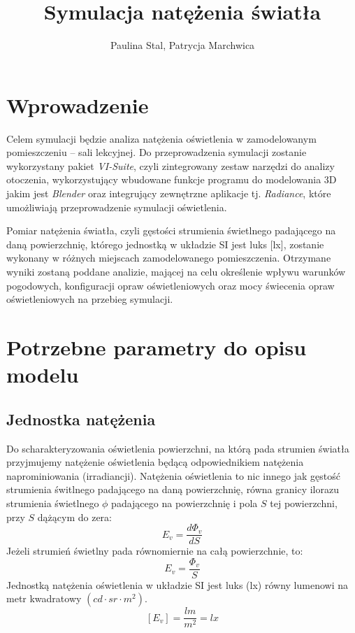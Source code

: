 \documentclass[a4paper,12pt]{article}
\title{Symulacja natężenia światła}
\author{Paulina Stal, Patrycja Marchwica}
\date{}
\begin{document}
	\maketitle
	
	\section{Wprowadzenie}
	\label{sec:wprowadzenie}
	
	Celem symulacji będzie analiza natężenia oświetlenia w zamodelowanym pomieszczeniu -- sali lekcyjnej. Do przeprowadzenia symulacji zostanie wykorzystany pakiet \emph{VI-Suite}, czyli zintegrowany zestaw narzędzi do analizy otoczenia, wykorzystujący wbudowane funkcje programu do modelowania 3D jakim jest \emph{Blender} oraz integrujący zewnętrzne aplikacje tj. \emph{Radiance}, które umożliwiają przeprowadzenie symulacji oświetlenia.
	
	Pomiar natężenia światła, czyli gęstości strumienia świetlnego padającego na daną powierzchnię, którego jednostką w układzie SI jest luks [lx], zostanie wykonany w różnych miejscach zamodelowanego pomieszczenia. Otrzymane wyniki zostaną poddane analizie, mającej na celu określenie wpływu warunków pogodowych, konfiguracji opraw oświetleniowych oraz mocy świecenia opraw oświetleniowych na przebieg symulacji.  
	

	\section{Potrzebne parametry do opisu modelu}
	 \label{sec:opis_modelu}

	\subsection{Jednostka natężenia}
	\label{subsec:jednostka_natezenia}

	Do scharakteryzowania oświetlenia powierzchni, na którą pada strumien światła przyjmujemy natężenie oświetlenia będącą odpowiednikiem natężenia naprominiowania (irradiancji). Natężenia oświetlenia to nic innego jak gęstość strumienia świtlnego padającego na daną powierzchnię, równa granicy ilorazu strumienia świetlnego $\phi$ padającego na powierzchnię i pola $S$ tej powierzchni, przy $S$ dążącym do zera:
	$$E_{v}=\frac{d \Phi_{v}}{d S}$$
	Jeżeli strumień świetlny pada równomiernie na całą powierzchnie, to:
	$$E_{v}=\frac{\Phi_{v}}{S}$$
Jednostką natężenia oświetlenia w układzie SI jest luks (lx) równy lumenowi na metr kwadratowy $(cd \cdot sr \cdot m^{2})$.
	$$\left[E_{v}\right]=\frac{l m}{m^{2}}=l x$$
	\newpage
\end{document}
